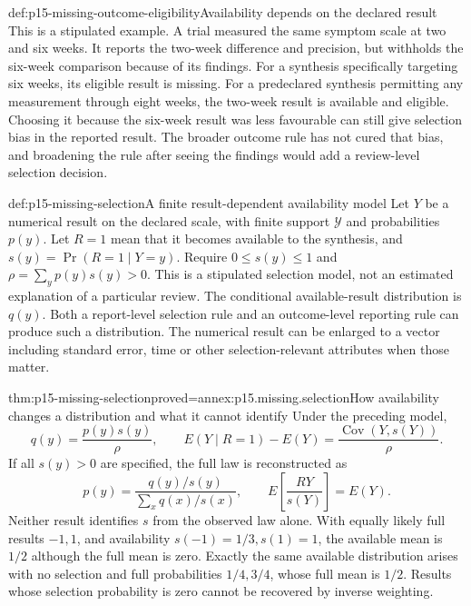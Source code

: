 \begin{hbexample}{def:p15-missing-outcome-eligibility}{Availability depends on the declared result}
This is a stipulated example. A trial measured the same symptom scale
at two and six weeks. It reports the two-week difference and precision,
but withholds the six-week comparison because of its findings.
For a synthesis specifically targeting six weeks, its eligible result
is missing. For a predeclared synthesis permitting any measurement
through eight weeks, the two-week result is available and eligible.
Choosing it because the six-week result was less favourable can still
give selection bias in the reported result. The broader outcome rule
has not cured that bias, and broadening the rule after seeing the
findings would add a review-level selection decision.
\end{hbexample}

\begin{hbdefinition}{def:p15-missing-selection}{A finite result-dependent availability model}
Let \(Y\) be a numerical result on the declared scale, with finite
support \(\mathcal Y\) and probabilities \(p(y)\).
Let \(R=1\) mean that it becomes available to the synthesis, and
\(s(y)=\Pr(R=1\mid Y=y)\). Require
\(0\leq s(y)\leq1\) and
\(\rho=\sum_y p(y)s(y)>0\). This is a stipulated selection
model, not an estimated explanation of a particular review.
The conditional available-result distribution is \(q(y)\).
Both a report-level selection rule and an outcome-level reporting
rule can produce such a distribution. The numerical result can
be enlarged to a vector including standard error, time or other
selection-relevant attributes when those matter.
\end{hbdefinition}

\begin{hbtheorem}{thm:p15-missing-selection}{proved=annex:p15.missing.selection}{How availability changes a distribution and what it cannot identify}
Under the preceding model,
\[
 q(y)=\frac{p(y)s(y)}\rho,\qquad
 E(Y\mid R=1)-E(Y)=\frac{\operatorname{Cov}(Y,s(Y))}\rho.
\]
If all \(s(y)>0\) are specified, the full law is reconstructed as
\[
 p(y)=\frac{q(y)/s(y)}{\sum_xq(x)/s(x)},\qquad
                  E\!\left[\frac{RY}{s(Y)}\right]=E(Y).
\]
Neither result identifies \(s\) from the observed law alone.
With equally likely full results \(-1,1\), and availability
\(s(-1)=1/3,s(1)=1\), the available mean is \(1/2\) although
the full mean is zero. Exactly the same available distribution
arises with no selection and full probabilities \(1/4,3/4\),
whose full mean is \(1/2\). Results whose selection probability
is zero cannot be recovered by inverse weighting.
\end{hbtheorem}

